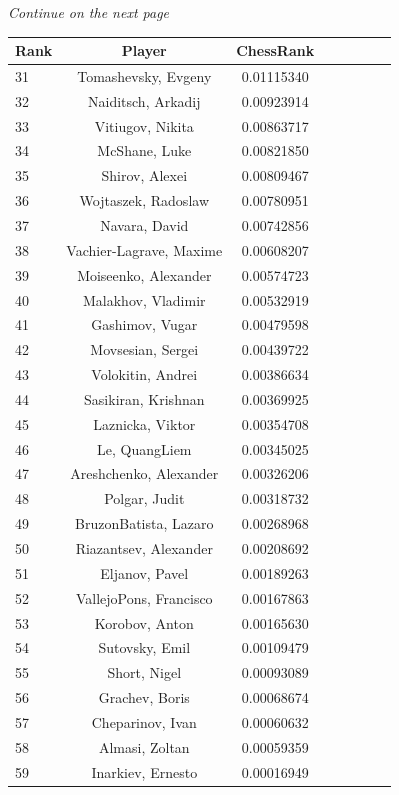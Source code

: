 \documentclass[pdftex,11pt,a4paper]{report}
\begin{document}
\emph{Continue on the next page}

\begin{singlespace}
\begin{tabular}{l*{6}{c}r}
Rank & Player & ChessRank \\ 
\hline
31 & Tomashevsky, Evgeny & 0.01115340 \\
32 & Naiditsch, Arkadij & 0.00923914 \\
33 & Vitiugov, Nikita & 0.00863717 \\
34 & McShane, Luke & 0.00821850 \\
35 & Shirov, Alexei & 0.00809467 \\
36 & Wojtaszek, Radoslaw & 0.00780951 \\
37 & Navara, David & 0.00742856 \\
38 & Vachier-Lagrave, Maxime & 0.00608207 \\
39 & Moiseenko, Alexander & 0.00574723 \\
40 & Malakhov, Vladimir & 0.00532919 \\
41 & Gashimov, Vugar & 0.00479598 \\
42 & Movsesian, Sergei & 0.00439722 \\
43 & Volokitin, Andrei & 0.00386634 \\
44 & Sasikiran, Krishnan & 0.00369925 \\
45 & Laznicka, Viktor & 0.00354708 \\
46 & Le, QuangLiem & 0.00345025 \\
47 & Areshchenko, Alexander & 0.00326206 \\
48 & Polgar, Judit & 0.00318732 \\
49 & BruzonBatista, Lazaro & 0.00268968 \\
50 & Riazantsev, Alexander & 0.00208692 \\
51 & Eljanov, Pavel & 0.00189263 \\
52 & VallejoPons, Francisco & 0.00167863 \\
53 & Korobov, Anton & 0.00165630 \\
54 & Sutovsky, Emil & 0.00109479 \\
55 & Short, Nigel & 0.00093089 \\
56 & Grachev, Boris & 0.00068674 \\
57 & Cheparinov, Ivan & 0.00060632 \\
58 & Almasi, Zoltan & 0.00059359 \\
59 & Inarkiev, Ernesto & 0.00016949 \\
\end{tabular}
\end{singlespace}
\end{document}
